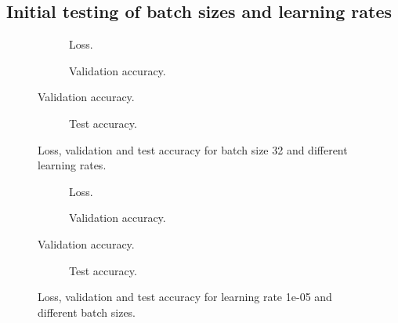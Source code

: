 \subsection{Initial testing of batch sizes and learning rates}

\begin{figure}
	\begin{subfigure}[b]{\textwidth}
		
		\caption{Loss.}
	\end{subfigure}

	\begin{subfigure}[b]{\textwidth}
		
		\caption{Validation accuracy.}
	\end{subfigure}
\end{figure}

\begin{figure}
	\ContinuedFloat
	\begin{subfigure}[b]{\textwidth}
		
		\caption{Test accuracy.}
	\end{subfigure}
	\caption{Loss, validation and test accuracy for batch size 32 and different learning rates.}
	\label{fig:res_init_lr}
\end{figure}


\begin{figure}
	\begin{subfigure}[b]{\textwidth}
		
		\caption{Loss.}
	\end{subfigure}

	\begin{subfigure}[b]{\textwidth}
		
		\caption{Validation accuracy.}
	\end{subfigure}
\end{figure}

\begin{figure}
	\ContinuedFloat
	\begin{subfigure}[b]{\textwidth}
		
		\caption{Test accuracy.}
	\end{subfigure}
	\caption{Loss, validation and test accuracy for learning rate 1e-05 and different batch sizes.}
	\label{fig:res_init_bs}
\end{figure}


